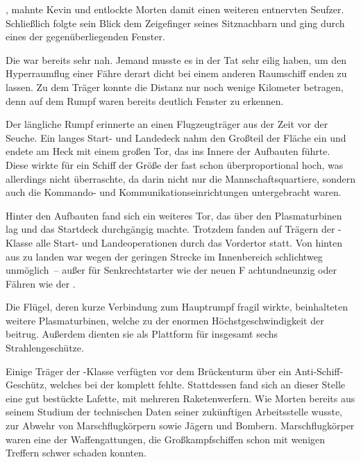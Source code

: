 \par

, mahnte Kevin und entlockte Morten damit einen weiteren entnervten Seufzer. Schließlich folgte sein Blick dem Zeigefinger seines Sitznachbarn und ging durch eines der gegenüberliegenden Fenster.

\par

Die  war bereits sehr nah. Jemand musste es in der Tat sehr eilig haben, um den Hyperraumflug einer Fähre derart dicht bei einem anderen Raumschiff enden zu lassen. Zu dem Träger konnte die Distanz nur noch wenige Kilometer betragen, denn auf dem Rumpf waren bereits deutlich Fenster zu erkennen.

\par

Der längliche Rumpf erinnerte an einen Flugzeugträger aus der Zeit vor der Seuche. Ein langes Start- und Landedeck nahm den Großteil der Fläche ein und endete am Heck mit einem großen Tor, das ins Innere der Aufbauten führte. Diese wirkte für ein Schiff der Größe der  fast schon überproportional hoch, was allerdings nicht überraschte, da darin nicht nur die Mannschaftsquartiere, sondern auch die Kommando- und Kommunikationseinrichtungen untergebracht waren.

\par

Hinter den Aufbauten fand sich ein weiteres Tor, das über den Plasmaturbinen lag und das Startdeck durchgängig machte. Trotzdem fanden auf Trägern der -Klasse alle Start- und Landeoperationen durch das Vordertor statt. Von hinten aus zu landen war wegen der geringen Strecke im Innenbereich schlichtweg unmöglich~-- außer für Senkrechtstarter wie der neuen F achtundneunzig oder Fähren wie der .

\par

Die Flügel, deren kurze Verbindung zum Hauptrumpf fragil wirkte, beinhalteten weitere Plasmaturbinen, welche zu der enormen Höchstgeschwindigkeit der  beitrug. Außerdem dienten sie als Plattform für insgesamt sechs Strahlengeschütze.

\par

Einige Träger der -Klasse verfügten vor dem Brückenturm über ein Anti-Schiff-Geschütz, welches bei der  komplett fehlte. Stattdessen fand sich an dieser Stelle eine gut bestückte Lafette, mit mehreren Raketenwerfern. Wie Morten bereits aus seinem Studium der technischen Daten seiner zukünftigen Arbeitsstelle wusste, zur Abwehr von Marschflugkörpern sowie Jägern und Bombern. Marschflugkörper waren eine der Waffengattungen, die Großkampfschiffen schon mit wenigen Treffern schwer schaden konnten.

